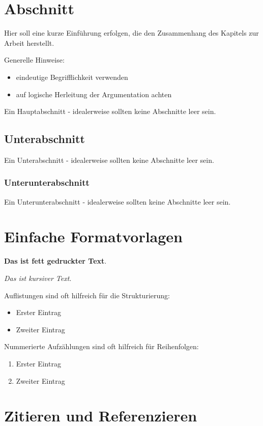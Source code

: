 
\section{Abschnitt} 
Hier soll eine kurze Einführung erfolgen, die den Zusammenhang des Kapitels zur Arbeit herstellt.

Generelle Hinweise:

\begin{itemize}
\item eindeutige Begrifflichkeit verwenden
\item auf logische Herleitung der Argumentation achten
\end{itemize}

Ein Hauptabschnitt - idealerweise sollten keine Abschnitte leer sein.

\subsection{Unterabschnitt}
Ein Unterabschnitt - idealerweise sollten keine Abschnitte leer sein.

\subsubsection{Unterunterabschnitt}
Ein Unterunterabschnitt - idealerweise sollten keine Abschnitte leer sein.

\section{Einfache Formatvorlagen}

\textbf{Das ist fett gedruckter Text}.

\textit{Das ist kursiver Text}.


Auflistungen sind oft hilfreich für die Strukturierung:
\begin{itemize}
    \item Erster Eintrag
    \item Zweiter Eintrag
\end{itemize}

Nummerierte Aufzählungen sind oft hilfreich für Reihenfolgen:
\begin{enumerate}
    \item Erster Eintrag
    \item Zweiter Eintrag
\end{enumerate}


\section{Zitieren und Referenzieren}

